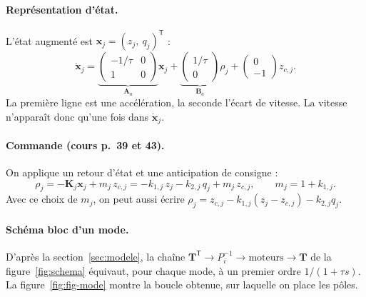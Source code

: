 \documentclass[11pt,a4paper]{article}
\newcommand{\vect}[1]{\boldsymbol{#1}}
\newcommand{\T}{\mathsf{T}}
\newcommand{\Tm}{\vect{T}}
\begin{document}
\paragraph{Représentation d'état.}
L'état augmenté est $\vect x_j=(z_j,\ q_j)^\T$ :
\begin{equation}
\dot{\vect x}_j=
\underbrace{\begin{pmatrix}-1/\tau & 0\\ 1 & 0\end{pmatrix}}_{\vect A_a}\vect x_j
+\underbrace{\begin{pmatrix}1/\tau\\ 0\end{pmatrix}}_{\vect B_a}\rho_j
+\begin{pmatrix}0\\ -1\end{pmatrix}z_{c,j}.
\end{equation}
La première ligne est une accélération, la seconde l'écart de vitesse.
La vitesse n'apparaît donc qu'une fois dans $\dot{\vect x}_j$.

\paragraph{Commande (cours p.~39 et 43).}
On applique un retour d'état et une anticipation de consigne :
\begin{equation}
\rho_j=-\vect K_j\vect x_j+m_j\,z_{c,j}=-k_{1,j}\,z_j-k_{2,j}\,q_j+m_j\,z_{c,j},
\qquad m_j=1+k_{1,j}.
\end{equation}
Avec ce choix de $m_j$, on peut aussi écrire $\rho_j=z_{c,j}-k_{1,j}(z_j-z_{c,j})-k_{2,j}q_j$.

\paragraph{Schéma bloc d'un mode.}
D'après la section~\ref{sec:modele}, la chaîne $\Tm^\T\rightarrow P_i^{-1}\rightarrow\text{moteurs}\rightarrow\Tm$
de la figure~\ref{fig:schema} équivaut, pour chaque mode, à un premier ordre $1/(1+\tau s)$.
La figure~\ref{fig:fig-mode} montre la boucle obtenue, sur laquelle on place les pôles.
\end{document}
